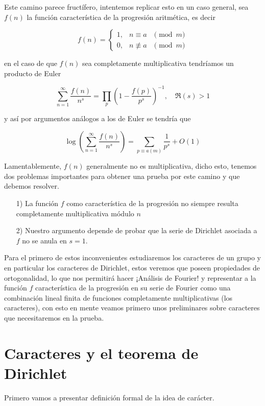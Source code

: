 Este camino parece fructífero, intentemos replicar esto en un caso general, sea $f(n)$ la función característica de la progresión aritmética, es decir

$$
f(n)=\left\{\begin{array}{lll}
1, & n \equiv a & \pmod{m} \\
0, & n \not \equiv a & \pmod{m}
\end{array}\right.
$$

en el caso de que $f(n)$ sea completamente multiplicativa tendríamos un producto de Euler

$$
\sum_{n=1}^{\infty} \frac{f(n)}{n^s}=\prod_p\left(1-\frac{f(p)}{p^s}\right)^{-1}, \quad \Re(s)>1
$$

y así por argumentos análogos a los de Euler se tendría que

$$\log \left(\sum_{n=1}^{\infty} \frac{f(n)}{n^s}\right)=\sum_{p \equiv a(m)} \frac{1}{p^s}+O(1)$$

Lamentablemente, $f(n)$ generalmente no es multiplicativa, dicho esto, tenemos dos problemas importantes para obtener una prueba por este camino y que debemos resolver.

\begin{itemize}
\item[1)] La función $f$ como característica de la progresión no siempre resulta completamente multiplicativa módulo $n$
\item[2)] Nuestro argumento depende de  probar que la serie de Dirichlet asociada a $f$ no se anula en $s=1$.
\end{itemize}

Para el primero de estos inconvenientes estudiaremos los caracteres de un grupo y en particular los caracteres de Dirichlet, estos veremos que poseen propiedades de ortogonalidad, lo que nos permitirá hacer ¡Análisis de Fourier! y representar a la función $f$ característica de la progresión en su serie de Fourier como una combinación lineal finita de funciones completamente multiplicativas (los caracteres), con esto en mente veamos primero unos preliminares sobre caracteres que necesitaremos en la prueba.

\section{Caracteres y el teorema de Dirichlet}

Primero vamos a presentar definición formal de la idea de carácter.\\

